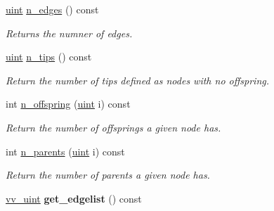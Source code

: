 \begin{DoxyCompactItemize}
\mbox{\label{classpruner_1_1Tree_ad1001e8f3eec76e33c7984a5cbe62a45}} 
\hyperlink{namespacepruner_a659e6e64a9e2b8e981c3d34262a2f67e}{uint} \hyperlink{classpruner_1_1Tree_ad1001e8f3eec76e33c7984a5cbe62a45}{n\+\_\+edges} () const
\begin{DoxyCompactList}\small\item\em Returns the numner of edges. \end{DoxyCompactList}\item 
\mbox{\label{classpruner_1_1Tree_a8ac445babc8822e53144d5a4051f931b}} 
\hyperlink{namespacepruner_a659e6e64a9e2b8e981c3d34262a2f67e}{uint} \hyperlink{classpruner_1_1Tree_a8ac445babc8822e53144d5a4051f931b}{n\+\_\+tips} () const
\begin{DoxyCompactList}\small\item\em Return the number of tips defined as nodes with no offspring. \end{DoxyCompactList}\item 
\mbox{\label{classpruner_1_1Tree_a66351f434b1a92e9121ced0535b024a2}} 
int \hyperlink{classpruner_1_1Tree_a66351f434b1a92e9121ced0535b024a2}{n\+\_\+offspring} (\hyperlink{namespacepruner_a659e6e64a9e2b8e981c3d34262a2f67e}{uint} i) const
\begin{DoxyCompactList}\small\item\em Return the number of offsprings a given node has. \end{DoxyCompactList}\item 
\mbox{\label{classpruner_1_1Tree_a4bacee9412759e72d7df95127d6f70a2}} 
int \hyperlink{classpruner_1_1Tree_a4bacee9412759e72d7df95127d6f70a2}{n\+\_\+parents} (\hyperlink{namespacepruner_a659e6e64a9e2b8e981c3d34262a2f67e}{uint} i) const
\begin{DoxyCompactList}\small\item\em Return the number of parents a given node has. \end{DoxyCompactList}\item 
\mbox{\label{classpruner_1_1Tree_ae0a8c80679a111970b560c0cdcdbc107}} 
\hyperlink{namespacepruner_acc0badaa0c5a170f5f93cfc20ec428a2}{vv\+\_\+uint} {\bfseries get\+\_\+edgelist} () const
\item 
\mbox{\label{classpruner_1_1Tree_a2c14caeb3feb1de3c1478f6ce1cad15f}} 

\end{DoxyCompactItemize}
